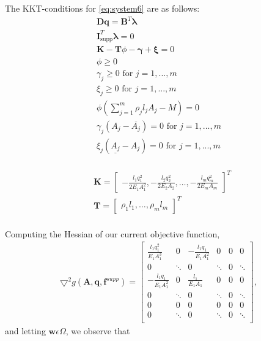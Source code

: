 

The KKT-conditions for \eqref{eq:system6} are as follows:
\begin{equation}
\label{KKT_system6}
\begin{aligned}
\bm{Dq} = \bm{B}^{T}\bm{\lambda}\\
\bm{I}^{T}_{\textrm{supp}}\bm{\lambda} = 0 \\
\bm{K} - \bm{T}\phi - \bm{\gamma} + \bm{\xi} = 0 \\
\phi \geq 0  \\
\gamma_j \geq 0 \text{ for } j = 1,...,m \\
\xi_j \geq 0 \text{ for } j = 1,...,m \\
\phi(\sum\limits_{j=1}^{m}\rho_{j}l_{j}A_{j}-M) = 0 \\
\gamma_{j}(A_{j}-\overline{A_{j}}) = 0 \text{ for } j = 1,...,m \\
\xi_{j}(\underline{A_{j}}-A_{j}) = 0 \text{ for } j = 1,...,m \\
\end{aligned}
\end{equation}

\begin{align*}
&\bm{K} = \begin{bmatrix}
       -\frac{l_{1}q_{1}^2}{2E_{1}A_{1}^2}
       , -\frac{l_{2}q_{2}^2}{2E_{2}A_{2}}, \hdots,-\frac{l_{m}q_{m}^2}{2E_{m}A_{m}}
     \end{bmatrix}^T \\
&\bm{T} = \begin{bmatrix}
       \rho_{1}l_{1}
       , \hdots,\rho_{m}l_{m}
     \end{bmatrix}^T \\
\end{align*}

Computing the Hessian of our current objective function,
\begin{align*}
\bm{\bigtriangledown}^2 g(\bm{A},\bm{q},\bm{f}^{supp}) =
\left[\begin{array}{cc|cc|cc}
\frac{l_1q_1^2}{E_1A_1^3}&0& -\frac{l_1q_1}{E_1A_1^2} &0 & 0 & 0\\[0.3em]
0 &\ddots &0 & \ddots & 0 & \ddots\\[0.3em] \hline
-\frac{l_1q_1}{E_1A_1^2} & 0 & \frac{l_1}{E_1A_1} & 0 & 0 & 0\\[0.3em]
0 &\ddots & 0 &\ddots & 0 & \ddots\\[0.3em] \hline
0 & 0 & 0 & 0 & 0 & 0 \\[0.3em]
0 & \ddots & 0 & \ddots & 0 & \ddots\\[0.3em]
\end{array}\right],
\end{align*}
and letting $\bm{w}  \epsilon  \Omega$, we observe that

